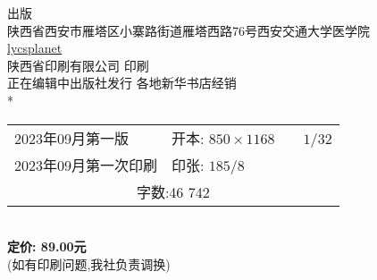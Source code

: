 \begin{center}
        {\makeatletter
    \fontsize{10}{10}\rmfamily\selectfont\@pressname 
    \makeatother}出版\\ 
    {\footnotesize 陕西省西安市雁塔区小寨路街道雁塔西路76号西安交通大学医学院}\\ 
    \href{https://lycsplanet.com/}{lycsplanet}\\ 
    {\fontsize{10}{10}\rmfamily\selectfont 陕西省印刷有限公司} 印刷\\ 
    正在编辑中出版社发行\hspace{2em} 各地新华书店经销\\ 
    \bigskip
    *\\
    \bigskip
    {\footnotesize\begin{tabular}{ll} 2023年09月第一版 & 开本: $850\times1168\quad \quad1/32$\\ 
    2023年09月第一次印刷 & 印张: $18 5/8$\\ 
    \multicolumn{2}{c}{字数:46 742}\\
    \end{tabular}}\\ 
    {\fontsize{10}{10}\rmfamily\bfseries\selectfont 定价: 89.00元}\\ 
    {\footnotesize (如有印刷问题,我社负责调换)}


    \end{center}





